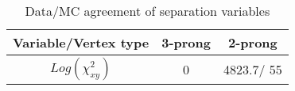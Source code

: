 \documentclass{article}
\begin{document}
\begin{table}[htbp]
\caption{\label{tab:sepVars}Data/MC agreement of separation variables}
\begin{center}
\begin{tabular}{c|c|c}
Variable/Vertex type & 3-prong & 2-prong\\
\hline
$Log(\chi^{2}_{xy})$ & 0 & 4823.7/ 55\\
\hline
\end{tabular}
\end{center}
\end{table}
\end{document}
